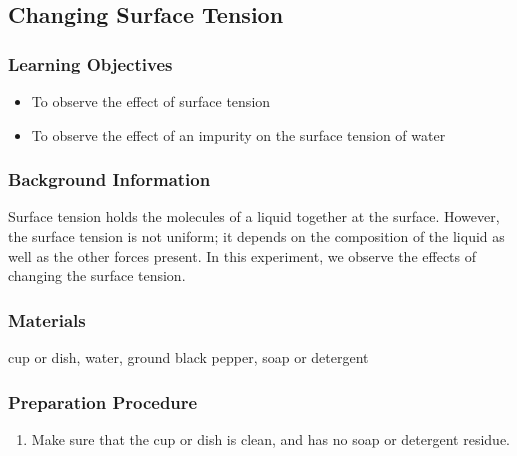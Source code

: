 \subsection{Changing Surface Tension}

\subsubsection*{Learning Objectives}
\begin{itemize}
\item{To observe the effect of surface tension}
\item{To observe the effect of an impurity on the surface tension of water}
\end{itemize}

\subsubsection*{Background Information}
Surface tension holds the molecules of a liquid together at the surface. However, the surface tension is not uniform; it depends on the composition of the liquid as well as the other forces present. In this experiment, we observe the effects of changing the surface tension.

\subsubsection*{Materials}
cup or dish, water, ground black pepper, soap or detergent

\subsubsection*{Preparation Procedure}
\begin{enumerate}
\item{Make sure that the cup or dish is clean, and has no soap or detergent residue.}
\end{enumerate}

